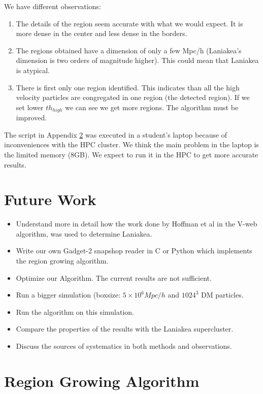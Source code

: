 \documentclass[12pt]{article}
\begin{document}
We have different observations:\\
\begin{enumerate}
	\item The details of the region seem accurate with what we would expect. It is more dense in the center and less dense in the borders.
	\item The regions obtained have a dimension of only a few Mpc/h (Laniakea's dimension is two orders of magnitude higher). This could mean that Laniakea is atypical. 
    \item There is first only one region identified. This indicates than all the high velocity particles are congregated in one region (the detected region). If we set lower $th_{high}$ we can see we get more regions. The algorithm must be improved.
\end{enumerate}

The script in Appendix \ref{App:AppendixA} was executed in a student's
laptop because of inconveniences with the HPC cluster. We think the main
problem in the laptop is the limited memory (8GB). We expect to run it in the
HPC to get more accurate results.

\section{Future Work}
\begin{itemize}
	\item Understand more in detail how the work done by Hoffman et al\cite{hoffman_kinematic_2012} in the V-web algorithm, was used to determine Laniakea.
    \item Write our own Gadget-2 snapshop reader in C or Python which implements the region growing algorithm.
    \item Optimize our Algorithm. The current results are not sufficient.
    \item Run a bigger simulation (boxsize: $5 \times 10^{6} Mpc/h$ and $1024^3$ DM particles.
    \item Run the algorithm on this simulation.
    \item Compare the properties of the results with the Laniakea supercluster.
    \item Discuss the sources of systematics in both methods and observations.
\end{itemize}







\appendix
\section{Region Growing Algorithm} \label{App:AppendixA}
\tiny

\end{document}

